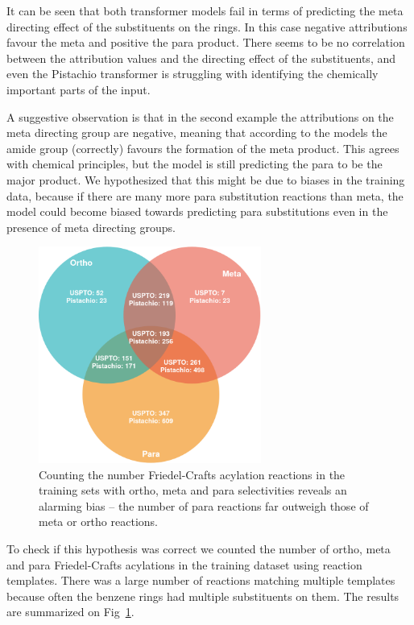 It can be seen that both transformer models fail in terms of predicting the meta directing effect of the substituents on the rings. In this case negative attributions favour the meta and positive the para product. There seems to be no correlation between the attribution values and the directing effect of the substituents, and even the Pistachio transformer is struggling with identifying the chemically important parts of the input. 

A suggestive observation is that in the second example the attributions on the meta directing group are negative, meaning that according to the models the amide group (correctly) favours the formation of the meta product. This agrees with chemical principles, but the model is still predicting the para to be the major product. We hypothesized that this might be due to biases in the training data, because if there are many more para substitution reactions than meta, the model could become biased towards predicting para substitutions even in the presence of meta directing groups. 

\begin{figure}[htbp!] 
\centering    
\includegraphics[width=0.65\textwidth]{Chapters/Ch4/Figs/sear_directing.png}
\caption[FC IG]{Counting the number Friedel-Crafts acylation reactions in the training sets with ortho, meta and para selectivities reveals an alarming bias -- the number of para reactions far outweigh those of meta or ortho reactions.}
\label{fig:sear_dir}
\end{figure}

To check if this hypothesis was correct we counted the number of ortho, meta and para Friedel-Crafts acylations in the training dataset using reaction templates. There was a large number of reactions matching multiple templates because often the benzene rings had multiple substituents on them. The results are summarized on Fig~\ref{fig:sear_dir}. 

